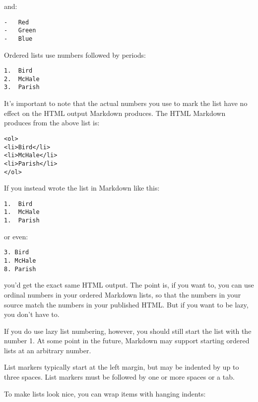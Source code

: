 and:

\begin{lstlisting}
-   Red
-   Green
-   Blue
\end{lstlisting}




Ordered lists use numbers followed by periods:

\begin{lstlisting}
1.  Bird
2.  McHale
3.  Parish
\end{lstlisting}




It's important to note that the actual numbers you use to mark the
list have no effect on the HTML output Markdown produces. The HTML
Markdown produces from the above list is:

\begin{lstlisting}
<ol>
<li>Bird</li>
<li>McHale</li>
<li>Parish</li>
</ol>
\end{lstlisting}




If you instead wrote the list in Markdown like this:

\begin{lstlisting}
1.  Bird
1.  McHale
1.  Parish
\end{lstlisting}




or even:

\begin{lstlisting}
3. Bird
1. McHale
8. Parish
\end{lstlisting}




you'd get the exact same HTML output. The point is, if you want to,
you can use ordinal numbers in your ordered Markdown lists, so that
the numbers in your source match the numbers in your published HTML.
But if you want to be lazy, you don't have to.



If you do use lazy list numbering, however, you should still start the
list with the number 1. At some point in the future, Markdown may support
starting ordered lists at an arbitrary number.



List markers typically start at the left margin, but may be indented by
up to three spaces. List markers must be followed by one or more spaces
or a tab.



To make lists look nice, you can wrap items with hanging indents:

